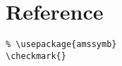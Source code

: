 
\chapter{Reference}
\label{cha:reference}

\begin{lstlisting}
% \usepackage{amssymb}
\checkmark{}
\end{lstlisting}
\checkmark{}
